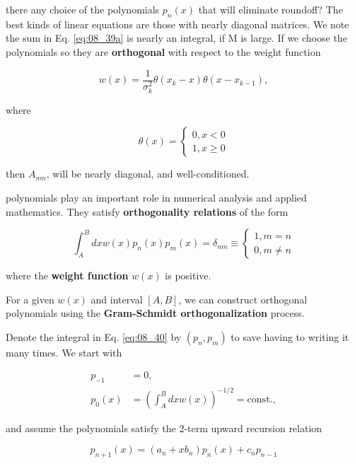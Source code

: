  there any choice of the polynomials $p_{n}(x)$ that will eliminate roundoff? The best kinds of linear equations are those with nearly diagonal matrices. We note the sum in Eq. \ref{eq:08_39a} is nearly an integral, if M is large. If we choose the polynomials so they are \textbf{orthogonal} with respect to the weight function

\begin{equation*}
w(x) = \frac{1}{\sigma_{k}^{2}} \theta(x_{k} - x ) \theta(x - x_{k-1}),
\end{equation*}

where

\begin{equation*}
\theta(x) =
    \begin{cases}
        0, x < 0 \\
        1, x \geq 0
    \end{cases}
\end{equation*}

then $A_{nm}$, will be nearly diagonal, and well-conditioned.

 polynomials play an important role in numerical analysis and applied mathematics. They satisfy \textbf{orthogonality relations} of the form

\begin{equation}\label{eq:08_40}
\int_{A}^{B} dx w(x)p_{n}(x)p_{m}(x) = \delta_{nm} \equiv 
    \begin{cases}
        1, m   = n \\
        0, m \ne n 
    \end{cases}
\end{equation}

where the \textbf{weight function} $w(x)$ is positive.

For a given $w(x)$ and interval $[A,B]$, we can construct orthogonal polynomials using the \textbf{Gram-Schmidt orthogonalization} process.

Denote the integral in Eq. \ref{eq:08_40} by $(p_{n}, p_{m})$ to save having to writing it many times. We start with


  \begin{align*}
p_{-1} & = 0, \\
p_{0}(x) & = (\int_{A}^{B}dx w(x))^{-1/2} = \text{const.} ,
  \end{align*}

and assume the polynomials satisfy the 2-term upward recursion relation

\begin{equation}
p_{n+1}(x) = (a_{n} + xb_{n} ) p_{n}(x) + c_{n}p_{n-1}
\end{equation}

